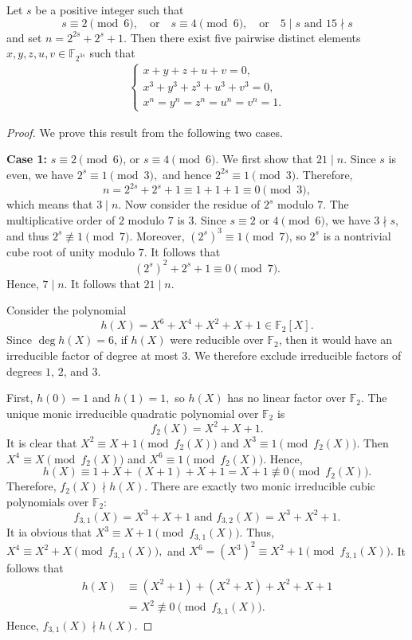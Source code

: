 \documentclass[10pt,a4paper]{amsart}
\begin{document}
\begin{lemma}\label{lem:V1I}
Let \(s\) be a positive integer such that
\[
s\equiv 2 \pmod 6,
\quad\text{or}\quad
s\equiv 4 \pmod 6,
\quad\text{or}\quad 5\mid s
\,\,\text{and}\,\,
15\nmid s
\]
and set
$
n=2^{2s}+2^s+1.
$
Then there exist five pairwise distinct elements
$
x,y,z,u,v\in \mathbb F_{2^{3s}}
$
such that
\begin{eqnarray*}
\begin{cases}
x+y+z+u+v=0,  \\
x^3+y^3+z^3+u^3+v^3=0,\\
x^n=y^n=z^n=u^n=v^n=1.
\end{cases}
\end{eqnarray*}
\end{lemma}

\begin{proof}
We prove this result from the following two cases.

\noindent
\textbf{Case 1:} $s\equiv 2 \pmod 6$,
or
$s\equiv 4 \pmod 6$.  We first show that \(21\mid n\).
Since \(s\) is even, we have
$
2^s\equiv 1 \pmod 3,
$
and hence
$
2^{2s}\equiv 1 \pmod 3.
$
Therefore,
\[
n=2^{2s}+2^s+1\equiv 1+1+1\equiv 0 \pmod 3,
\]
which means that \(3\mid n\).
Now consider the residue of \(2^s\) modulo \(7\). The multiplicative order of \(2\) modulo \(7\) is \(3\). Since \(s\equiv 2\) or \(4\pmod 6\), we have \(3\nmid s\), and thus \(2^s\not\equiv 1\pmod 7\). Moreover, \((2^s)^3\equiv 1\pmod 7\), so \(2^s\) is a nontrivial cube root of unity modulo \(7\). It follows that
\[
(2^s)^2+2^s+1\equiv 0 \pmod 7.
\]
Hence, \(7\mid n\). It follows that
$
21\mid n.
$

Consider the polynomial
\begin{equation}\label{eqhX}
h(X)=X^6+X^4+X^2+X+1\in \mathbb F_2[X].
\end{equation}
Since \(\deg {h(X)}=6\), if \(h(X)\) were reducible over \(\mathbb F_2\), then it would have an irreducible factor of degree at most \(3\). We therefore exclude irreducible factors of degrees \(1\), \(2\), and \(3\).

First,
$h(0)=1$ and $h(1)=1,$
so \(h(X)\) has no linear factor over \(\mathbb F_2\).
The unique monic irreducible quadratic polynomial over \(\mathbb F_2\) is
$$
f_2(X)=X^2+X+1.
$$
It is clear that
$
X^2\equiv X+1 \pmod {f_2(X)}
$ and $
X^3\equiv1\pmod {f_2(X)}.
$
Then
$
X^4\equiv X \pmod {f_2(X)}
$ and
$X^6\equiv1 \pmod {f_2(X)}.
$
Hence,
$$
h(X)
\equiv
1+X+(X+1)+X+1
=
X+1
\not\equiv0
\pmod{f_2(X)}.
$$
Therefore, \(f_2(X)\nmid h(X)\).
There are exactly two monic irreducible cubic polynomials over \(\mathbb F_2\):
$$
f_{3,1}(X)=X^3+X+1\,\, \text{and}\,\,
f_{3,2}(X)=X^3+X^2+1.
$$
It ia obvious that
$
X^3\equiv X+1 \pmod {f_{3,1}(X)}.
$
Thus,
$
X^4\equiv X^2+X \pmod {f_{3,1}(X)},
$ and $
X^6=(X^3)^2\equiv X^2+1 \pmod {f_{3,1}(X)}.
$
It follows that
$$
\begin{aligned}
h(X)
&\equiv
(X^2+1)+(X^2+X)+X^2+X+1\\
&=X^2
\not\equiv0
\pmod{f_{3,1}(X)}.
\end{aligned}
$$
Hence, \(f_{3,1}(X)\nmid h(X)\).


\end{proof}
\end{document}
